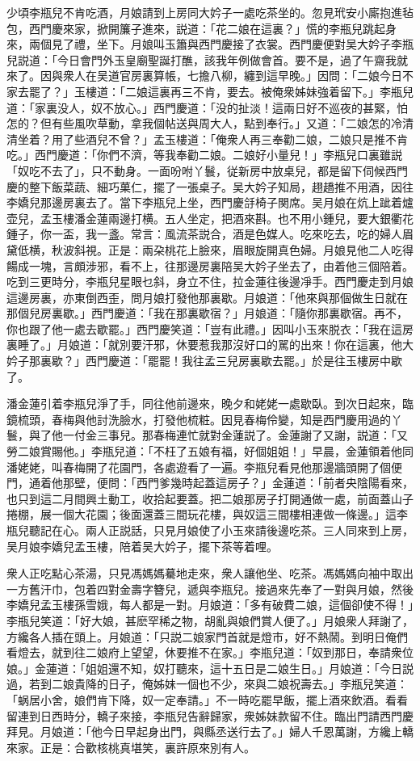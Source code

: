 少頃李瓶兒不肯吃酒，月娘請到上房同大妗子一處吃茶坐的。忽見玳安小廝抱進毡包，西門慶來家，掀開簾子進來，説道：「花二娘在這裏？」慌的李瓶兒跳起身來，兩個見了禮，坐下。月娘叫玉簫與西門慶接了衣裳。西門慶便對吴大妗子李瓶兒説道：「今日會門外玉皇廟聖誕打醮，該我年例做會首。要不是，過了午齋我就來了。因與衆人在吴道官房裏算帳，七擔八柳，纏到這早晚。」因問：「二娘今日不家去罷了？」玉樓道：「二娘這裏再三不肯，要去。被俺衆姊妹強着留下。」李瓶兒道：「家裏没人，奴不放心。」西門慶道：「没的扯淡！這兩日好不巡夜的甚緊，怕怎的？但有些風吹草動，拿我個帖送與周大人，點到奉行。」又道：「二娘怎的冷清清坐着？用了些酒兒不曾？」孟玉樓道：「俺衆人再三奉勸二娘，二娘只是推不肯吃。」西門慶道：「你們不濟，等我奉勸二娘。二娘好小量兒！」李瓶兒口裏雖説「奴吃不去了」，只不動身。一面吩咐丫鬟，従新房中放桌兒，都是留下伺候西門慶的整下飯菜蔬、細巧菓仁，擺了一張桌子。吴大妗子知局，趐趫推不用酒，因往李嬌兒那邊房裏去了。當下李瓶兒上坐，西門慶㧱椅子関席。吴月娘在炕上跐着爐壶兒，孟玉樓潘金蓮兩邊打横。五人坐定，把酒來斟。也不用小鍾兒，要大銀衢花鍾子，你一盃，我一盞。常言：風流茶説合，酒是色媒人。吃來吃去，吃的婦人眉黛低横，秋波斜視。正是：兩朶桃花上臉來，眉眼旋開真色婦。月娘見他二人吃得餳成一塊，言頗涉邪，看不上，往那邊房裏陪吴大妗子坐去了，由着他三個陪着。吃到三更時分，李瓶兒星眼乜斜，身立不住，拉金蓮往後邊凈手。西門慶走到月娘這邊房裏，亦東倒西歪，問月娘打發他那裏歇。月娘道：「他來與那個做生日就在那個兒房裏歇。」西門慶道：「我在那裏歇宿？」月娘道：「隨你那裏歇宿。再不，你也跟了他一處去歇罷。」西門慶笑道：「豈有此禮。」因叫小玉來脱衣：「我在這房裏睡了。」月娘道：「就別要汗邪，休要惹我那沒好口的駡的出來！你在這裏，他大妗子那裏歇？」西門慶道：「罷罷！我往孟三兒房裏歇去罷。」於是往玉樓房中歇了。

潘金蓮引着李瓶兒淨了手，同往他前邊來，晚夕和姥姥一處歇臥。到次日起來，臨鏡梳頭，春梅與他討洗臉水，打發他梳粧。因見春梅伶變，知是西門慶用過的丫鬟，與了他一付金三事兒。那春梅連忙就對金蓮説了。金蓮謝了又謝，説道：「又勞二娘賞賜他。」李瓶兒道：「不枉了五娘有福，好個姐姐！」早晨，金蓮領着他同潘姥姥，叫春梅開了花園門，各處遊看了一遍。李瓶兒看見他那邊牆頭開了個便門，通着他那壁，便問：「西門爹幾時起蓋這房子？」金蓮道：「前者央陰陽看來，也只到這二月間興土動工，收拾起要蓋。把二娘那房子打開通做一處，前面蓋山子捲棚，展一個大花園；後面還蓋三間玩花樓，與奴這三間樓相連做一條邊。」這李瓶兒聽記在心。兩人正説話，只見月娘使了小玉來請後邊吃茶。三人同來到上房，吴月娘李嬌兒孟玉樓，陪着吴大妗子，擺下茶等着哩。

衆人正吃點心茶湯，只見馮媽媽驀地走來，衆人讓他坐、吃茶。馮媽媽向袖中取出一方舊汗巾，包着四對金壽字簪兒，遞與李瓶兒。接過來先奉了一對與月娘，然後李嬌兒孟玉樓孫雪娥，每人都是一對。月娘道：「多有破費二娘，這個卻使不得！」李瓶兒笑道：「好大娘，甚麽罕稀之物，胡亂與娘們賞人便了。」月娘衆人拜謝了，方纔各人插在頭上。月娘道：「只説二娘家門首就是燈市，好不熱鬧。到明日俺們看燈去，就到往二娘府上望望，休要推不在家。」李瓶兒道：「奴到那日，奉請衆位娘。」金蓮道：「姐姐還不知，奴打聽來，這十五日是二娘生日。」月娘道：「今日説過，若到二娘貴降的日子，俺姊妹一個也不少，來與二娘祝壽去。」李瓶兒笑道：「蜗居小舍，娘們肯下降，奴一定奉請。」不一時吃罷早飯，擺上酒來飲酒。看看留連到日西時分，轎子來接，李瓶兒告辭歸家，衆姊妹款留不住。臨出門請西門慶拜見。月娘道：「他今日早起身出門，與縣丞送行去了。」婦人千恩萬謝，方纔上轎來家。正是：合歡核桃真堪笑，裏許原來別有人。

